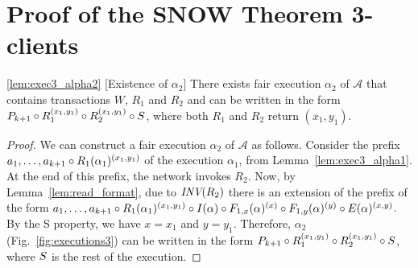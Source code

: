 \section{Proof of the SNOW Theorem 3-clients}
\label{app:sec5_lemmas}
\begin{lemma*}\ref{lem:exec3_alpha2} [Existence of $\alpha_2$] 
\sloppy There exists  fair execution $\alpha_2$  of $\mathcal{A}$ that contains transactions 
$W$, $R_1$ and $R_2$ and can be written in the form 
$\finiteprefixA{k}{k+1} \circ 
\frage{R_1}{}{x_1, y_1}
 \circ
 \frage{R_2}{}{x_1, y_1}
\circ \fragt{S}{\alpha_2}{}$, where both $R_1$ and $R_2$ return $(x_1, y_1)$.
\end{lemma*}

\begin{proof}

We can construct a fair execution  $\alpha_2$ of $\mathcal{A}$ as follows. Consider the prefix 
$\finiteprefixt{k}{k+1} \circ 
\frage{R_1}{\alpha_1}{x_1, y_1}$
of the execution $\alpha_1$, from Lemma~\ref{lem:exec3_alpha1}. At the end of this prefix, the network invokes $R_2$. Now, by 
Lemma~\ref{lem:read_format}, due to ${\textit{INV}(R_2)}$
there is an extension of the prefix of the form 
$\finiteprefixt{k}{k+1} \circ  \frage{R_1}{\alpha_1}{x_1, y_1} \circ 
\frage{I}{\alpha}{} \circ \frage{F_{1, x}}{\alpha}{x} \circ \frage{F_{1, y}}{\alpha}{y} \circ \frage{E}{\alpha}{x, y}$. 
By the S property, we have $x = x_1$ and $y= y_1$. Therefore, $\alpha_2$ (Fig.~\ref{fig:executions3}) can be written in the form
$\finiteprefixA{k}{k+1} \circ 
\frage{R_1}{}{x_1, y_1}
 \circ
 \frage{R_2}{}{x_1, y_1}
\circ \fragt{S}{\alpha_2}{}$, where $\fragt{S}{\alpha_2}{}$ is the rest of the execution.
%
\end{proof}

